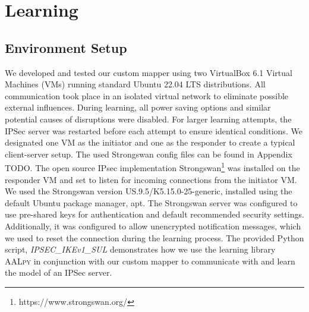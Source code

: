 %
%
% 
% 
% 

\chapter{Learning}

\label{chap:Learning}

\section{Environment Setup} \label{subsec:environment}
We developed and tested our custom mapper using two VirtualBox 6.1 Virtual Machines (VMs) running standard Ubuntu 22.04 LTS distributions. All communication took place in an isolated virtual network to eliminate possible external influences. During learning, all power saving options and similar potential causes of disruptions were disabled. For larger learning attempts, the IPSec server was restarted before each attempt to ensure identical conditions. We designated one VM as the initiator and one as the responder to create a typical client-server setup. The used Strongswan config files can be found in Appendix TODO. The open source IPsec implementation Strongswan\footnote{https://www.strongswan.org/} was installed on the responder VM and set to listen for incoming connections from the initiator VM. We used the Strongswan version US.9.5/K5.15.0-25-generic, installed using the default Ubuntu package manager, apt. The Strongswan server was configured to use pre-shared keys for authentication and default recommended security settings. Additionally, it was configured to allow unencrypted notification messages, which we used to reset the connection during the learning process. The provided Python script, \emph{IPSEC\_IKEv1\_SUL} demonstrates how we use the learning library \textsc{AALpy} in conjunction with our custom mapper to communicate with and learn the model of an IPSec server.

